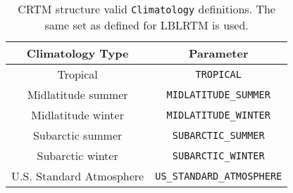 \begin{table}[htp]
  \centering
  \begin{tabular}{|c|c|}
    \hline
    \sffamily\textbf{Climatology Type} & \sffamily\textbf{Parameter} \\
    \hline\hline
             Tropical          &  \texttt{TROPICAL}\\              
        Midlatitude summer     &  \texttt{MIDLATITUDE\_SUMMER}\\
        Midlatitude winter     &  \texttt{MIDLATITUDE\_WINTER}\\
         Subarctic summer      &  \texttt{SUBARCTIC\_SUMMER}\\
         Subarctic winter      &  \texttt{SUBARCTIC\_WINTER}\\
     U.S. Standard Atmosphere  &  \texttt{US\_STANDARD\_ATMOSPHERE}\\
    \hline 
  \end{tabular}
  \caption{CRTM \Atmosphere{} structure valid \texttt{Climatology} definitions. The same set as defined for LBLRTM is used.}
  \label{tab:climatology}
\end{table}

